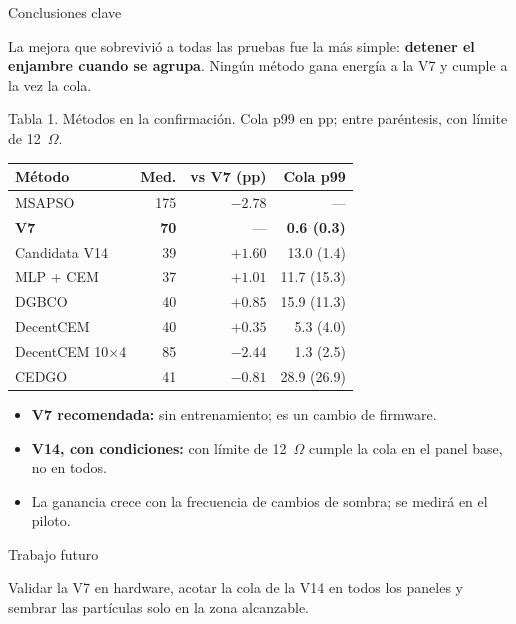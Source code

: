 \documentclass[10pt]{article}
\newcommand{\serif}{\fontfamily{bch}\selectfont}
\newcommand{\seccion}[1]{%
  \begin{tcolorbox}[colback=olive,colframe=olive,arc=0pt,
    boxrule=0pt,left=8pt,top=3pt,bottom=4pt,width=\linewidth]
    {\serif\color{white}\fontsize{30}{36}\selectfont #1}
  \end{tcolorbox}\vspace{-0.3em}}
\newcommand{\cuerpo}{\fontsize{24}{31}\selectfont}
\newcommand{\pie}[1]{{\sffamily\fontsize{18}{22}\selectfont\color{muted}#1}}
\newlength{\colh}
\begin{document}
\begin{minipage}[t][\colh][s]{0.30\linewidth}\cuerpo\vspace{0pt}

\seccion{Conclusiones clave}
La mejora que sobrevivió a todas las pruebas fue la más simple: \textbf{detener el enjambre cuando se agrupa}. Ningún método gana energía a la V7 y cumple a la vez la cola.

\begin{center}
\pie{Tabla 1. Métodos en la confirmación. Cola p99 en pp; entre paréntesis, con límite de 12~$\Omega$.}

\vspace{0.3em}
\fontsize{20}{25}\selectfont
\renewcommand{\arraystretch}{1.12}
\begin{tabular}{lrrr}
  \toprule
  \textbf{Método} & \textbf{Med.} & \textbf{vs V7 (pp)} & \textbf{Cola p99} \\
  \midrule
  MSAPSO & 175 & $-2.78$ & --- \\
  \textbf{V7} & \textbf{70} & --- & \textbf{0.6 (0.3)} \\
  Candidata V14 & 39 & $+1.60$ & 13.0 (1.4) \\
  MLP + CEM & 37 & $+1.01$ & 11.7 (15.3) \\
  DGBCO & 40 & $+0.85$ & 15.9 (11.3) \\
  DecentCEM & 40 & $+0.35$ & 5.3 (4.0) \\
  DecentCEM 10$\times$4 & 85 & $-2.44$ & 1.3 (2.5) \\
  CEDGO & 41 & $-0.81$ & 28.9 (26.9) \\
  \bottomrule
\end{tabular}
\end{center}

\begin{itemize}[leftmargin=1.2em,itemsep=0.3em]
  \item \textbf{V7 recomendada:} sin entrenamiento; es un cambio de firmware.
  \item \textbf{V14, con condiciones:} con límite de 12~$\Omega$ cumple la cola en el panel base, no en todos.
  \item La ganancia crece con la frecuencia de cambios de sombra; se medirá en el piloto.
\end{itemize}

\vfill
\seccion{Trabajo futuro}
Validar la V7 en hardware, acotar la cola de la V14 en todos los paneles y sembrar las partículas solo en la zona alcanzable.


\end{minipage}
\end{document}
